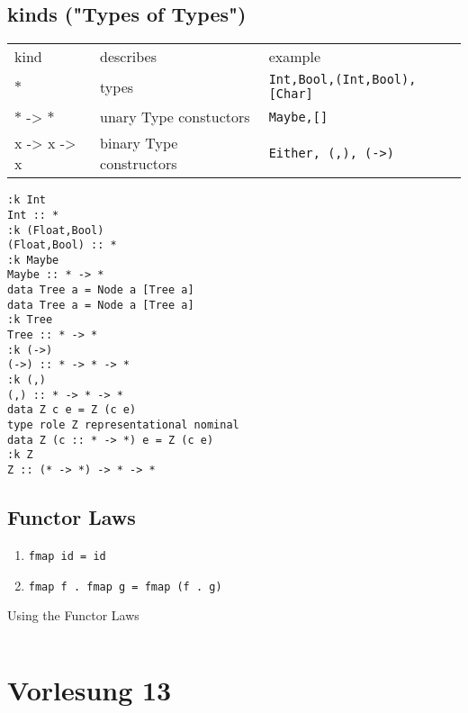 \documentclass{article}
\newcommand{\Haskell}[1]{\texttt{#1}}
\begin{document}
\subsection{kinds ("Types of Types")}
\begin{tabular}{l|l|l}
kind&describes&example\\
$\ast$&types&\Haskell{Int,Bool,(Int,Bool),[Char]}\\
$\ast$ -> $\ast$&unary Type constuctors&\Haskell{Maybe,[]}\\
x -> x -> x&binary Type constructors&\Haskell{Either, (,), (->)}
\end{tabular}
\begin{verbatim}
:k Int
Int :: *
:k (Float,Bool)
(Float,Bool) :: *
:k Maybe
Maybe :: * -> *
data Tree a = Node a [Tree a]
data Tree a = Node a [Tree a]
:k Tree
Tree :: * -> *
:k (->)
(->) :: * -> * -> *
:k (,)
(,) :: * -> * -> *
data Z c e = Z (c e)
type role Z representational nominal
data Z (c :: * -> *) e = Z (c e)
:k Z
Z :: (* -> *) -> * -> *
\end{verbatim}
\subsection{Functor Laws}
\begin{enumerate}[1.]
\item \Haskell{fmap id = id}
\item \Haskell{fmap f . fmap g = fmap (f . g)}
\end{enumerate}
\begin{listing}
\caption{Using the Functor Laws}
\inputminted{Haskell}{Pred.hs}
\end{listing}
\clearpage
\section{Vorlesung 13}
\end{document}
